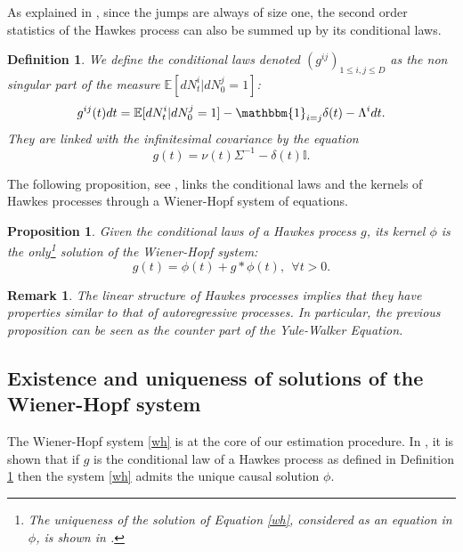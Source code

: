 \documentclass[a4paper,11pt]{article}
\newtheorem{definition}{Definition}[section]
\newtheorem{proposition}{Proposition}[section]
\newtheorem{remark}{Remark}[section]
\newcommand{\E}{\mathbb{E}}
\newcommand{\I}{\mathbb{I}}
\begin{document}
\noindent As explained in \cite{bacry2014second}, since the jumps are always of size one, the second order statistics of the Hawkes process can also be summed up by its conditional laws.
\begin{definition}
\label{def_claw}
We define the conditional laws denoted $(g^{ij})_{1\leq i, j\leq D}$ as the non singular part of the measure $\E[dN^i_{t}|dN^j_0=1]$:
$$g^{ij}(t)dt=\E[dN^i_{t}|dN^j_0=1]-\mathbbm{1}_{i=j}\delta(t)-\Lambda^idt.$$
They are linked with the infinitesimal covariance by the equation
\begin{equation}
\label{nug}
g(t) = \nu(t) \Sigma^{-1} -\delta(t)\I.
\end{equation}
\end{definition}
\noindent The following proposition, see \cite{bacry2014second}, links the conditional laws and the kernels of Hawkes processes through a Wiener-Hopf system of equations.
\begin{proposition}
Given the conditional laws of a Hawkes process $g$, its kernel $\phi$ is the only\footnote{The uniqueness of the solution of Equation \eqref{wh}, considered as an equation in $\phi$, is shown in \cite{bacry2014second}.} solution of the Wiener-Hopf system:
\begin{equation}
\label{wh}
g(t)=\phi(t)+g\ast\phi(t), ~~\forall t>0.
\end{equation}
\end{proposition}

\begin{remark}
The linear structure of Hawkes processes implies that they have properties similar to that of autoregressive processes. In particular, the previous proposition can be seen as the counter part of the Yule-Walker Equation.
\end{remark}



\subsection{Existence and uniqueness of solutions of the Wiener-Hopf system}
\label{existence}
The Wiener-Hopf system \eqref{wh} is at the core of our estimation procedure.
In \cite{bacry2014second}, it is shown that if $g$ is the conditional law of a Hawkes process as defined in Definition \ref{def_claw} then the system \eqref{wh} admits the unique causal solution $\phi$. \\

\end{document}
